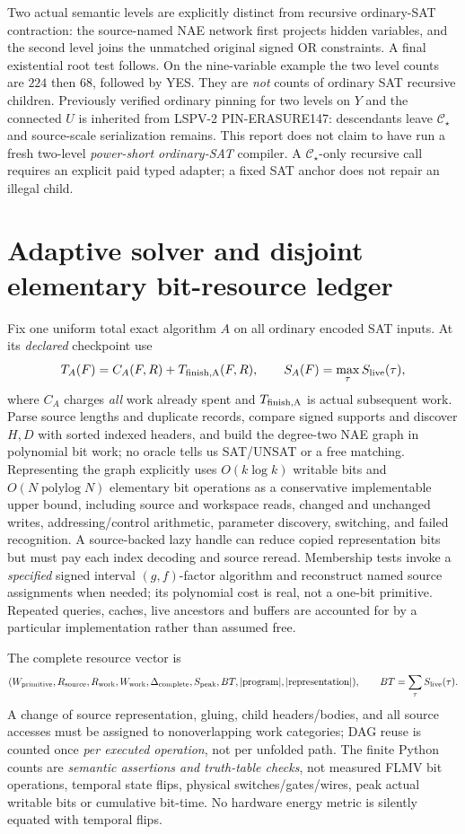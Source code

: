 \documentclass[11pt]{article}
\newcommand{\CS}{\mathcal C_{\star}}
\begin{document}
Two actual semantic levels are explicitly distinct from recursive ordinary-SAT contraction: the source-named NAE network first projects hidden variables, and the second level joins the unmatched original signed OR constraints. A final existential root test follows. On the nine-variable example the two level counts are $224$ then $68$, followed by YES. They are \emph{not} counts of ordinary SAT recursive children. Previously verified ordinary pinning for two levels on $Y$ and the connected $U$ is inherited from LSPV-2 PIN-ERASURE147: descendants leave $\CS$ and source-scale serialization remains. This report does not claim to have run a fresh two-level \emph{power-short ordinary-SAT} compiler. A $\CS$-only recursive call requires an explicit paid typed adapter; a fixed SAT anchor does not repair an illegal child.

\section{Adaptive solver and disjoint elementary bit-resource ledger}
Fix one uniform total exact algorithm $A$ on all ordinary encoded SAT inputs. At its \emph{declared} checkpoint use
\[
T_A(F)=C_A(F,R)+T_{\rm finish,A}(F,R),\qquad
S_A(F)=\max_\tau S_{\rm live}(\tau),
\]
where $C_A$ charges \emph{all} work already spent and $T_{\rm finish,A}$ is actual subsequent work. Parse source lengths and duplicate records, compare signed supports and discover $H,D$ with sorted indexed headers, and build the degree-two NAE graph in polynomial bit work; no oracle tells us SAT/UNSAT or a free matching. Representing the graph explicitly uses $O(k\log k)$ writable bits and $O(N\operatorname{polylog}N)$ elementary bit operations as a conservative implementable upper bound, including source and workspace reads, changed and unchanged writes, addressing/control arithmetic, parameter discovery, switching, and failed recognition. A source-backed lazy handle can reduce copied representation bits but must pay each index decoding and source reread. Membership tests invoke a \emph{specified} signed interval $(g,f)$-factor algorithm and reconstruct named source assignments when needed; its polynomial cost is real, not a one-bit primitive. Repeated queries, caches, live ancestors and buffers are accounted for by a particular implementation rather than assumed free.

The complete resource vector is
\[
(W_{\rm primitive},R_{\rm source},R_{\rm work},W_{\rm work},
\Delta_{\rm complete},S_{\rm peak},BT,
|\mathrm{program}|,|\mathrm{representation}|),\qquad
BT=\sum_\tau S_{\rm live}(\tau).
\]
A change of source representation, gluing, child headers/bodies, and all source accesses must be assigned to nonoverlapping work categories; DAG reuse is counted once \emph{per executed operation}, not per unfolded path. The finite Python counts are \emph{semantic assertions and truth-table checks}, not measured FLMV bit operations, temporal state flips, physical switches/gates/wires, peak actual writable bits or cumulative bit-time. No hardware energy metric is silently equated with temporal flips.
\end{document}
